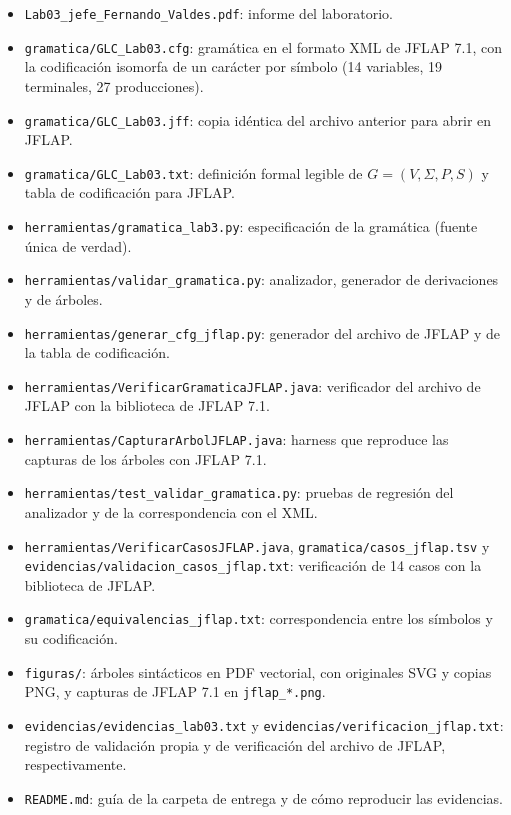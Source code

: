 \documentclass[11pt,letterpaper]{article}
\begin{document}
\begin{itemize}
  \item \texttt{Lab03\_jefe\_Fernando\_Valdes.pdf}: informe del laboratorio.
  \item \texttt{gramatica/\allowbreak GLC\_Lab03.cfg}: gramática en el formato XML de JFLAP 7.1, con
  la codificación isomorfa de un carácter por símbolo (14 variables, 19 terminales, 27 producciones).
  \item \texttt{gramatica/\allowbreak GLC\_Lab03.jff}: copia idéntica del archivo anterior para abrir en JFLAP.
  \item \texttt{gramatica/\allowbreak GLC\_Lab03.txt}: definición formal legible de $G=(V,\Sigma,P,S)$
  y tabla de codificación para JFLAP.
  \item \texttt{herramientas/\allowbreak gramatica\_lab3.py}: especificación de la gramática (fuente única de
  verdad).
  \item \texttt{herramientas/\allowbreak validar\_gramatica.py}: analizador, generador de derivaciones y de
  árboles.
  \item \texttt{herramientas/\allowbreak generar\_cfg\_jflap.py}: generador del archivo de JFLAP y de
  la tabla de codificación.
  \item \texttt{herramientas/\allowbreak VerificarGramaticaJFLAP.\allowbreak java}: verificador del archivo de JFLAP con
  la biblioteca de JFLAP 7.1.
  \item \texttt{herramientas/\allowbreak CapturarArbolJFLAP.\allowbreak java}: harness que reproduce las capturas de los
  árboles con JFLAP 7.1.
  \item \texttt{herramientas/\allowbreak test\_validar\_gramatica.py}: pruebas de regresión del analizador y de la correspondencia con el XML.
  \item \texttt{herramientas/\allowbreak VerificarCasosJFLAP.java},
  \texttt{gramatica/\allowbreak casos\_jflap.tsv} y
  \texttt{evidencias/\allowbreak validacion\_casos\_jflap.txt}: verificación de 14 casos con la biblioteca de JFLAP.
  \item \texttt{gramatica/\allowbreak equivalencias\_jflap.txt}: correspondencia entre los símbolos y su codificación.
  \item \texttt{figuras/}: árboles sintácticos en PDF vectorial, con originales SVG y copias PNG, y
  capturas de JFLAP 7.1 en \texttt{jflap\_*.png}.
  \item \texttt{evidencias/\allowbreak evidencias\_lab03.txt} y \texttt{evidencias/\allowbreak verificacion\_jflap.txt}:
  registro de validación propia y de verificación del archivo de JFLAP, respectivamente.
  \item \texttt{README.md}: guía de la carpeta de entrega y de cómo reproducir las evidencias.
\end{itemize}
\end{document}
